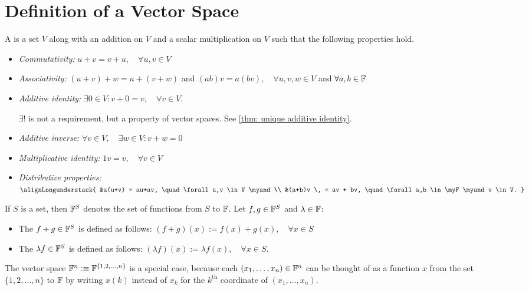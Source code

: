 \section{Definition of a Vector Space}

\setcounter{thm}{19}
\begin{mydef} 
  A  is a set $V$ along with an addition on $V$ and a scalar multiplication on $V$ such that the following properties hold.
  \begin{itemize}
    \item \emph{Commutativity:}
    $ u+v = v+u, \quad \forall u,v \in V$
    \item \emph{Associativity:}
    $(u+v)+w=u+(v+w)$ and $(ab)v=a(bv), \quad \forall u,v,w \in V$ and $\forall a,b \in \mathbb{F}$
    \item \emph{Additive identity:}
    $\exists 0\in V:v+0=v, \quad \forall v\in V$.

    $\exists!$ is not a requirement, but a property of vector spaces. See \ref{thm: unique additive identity}.
    \item \emph{Additive inverse:}
    $\forall v\in V, \quad \exists w\in V: v+w=0$
    \item \emph{Multiplicative identity:}
    $1v = v, \quad \forall v\in V$
    \item \emph{Distributive properties:}
    $
      \alignLongunderstack{
        &a(u+v) = au+av, \quad \forall u,v \in V \myand  \\
        &(a+b)v \, = av + bv, \quad \forall a,b \in \myF \myand v \in V.
      }
    $
  \end{itemize}
\end{mydef}

\setcounter{thm}{23}
\begin{mydef} 
  If $S$ is a set, then $\mathbb{F}^S$ denotes the set of functions from $S$ to $\mathbb{F}$. Let $f, g \in \mathbb{F}^{S}$ and $\lambda \in \mathbb{F}$:
  \begin{itemize}
    \item The  $f+g \in \mathbb{F}^{S}$ is defined as follows: $(f+g)(x) := f(x)+ g(x), \quad \forall x\in S$
    \item The  $\lambda f \in \mathbb{F}^{S}$ is defined as follows: $(\lambda f)(x) := \lambda f(x), \quad \forall x \in S$.
  \end{itemize}
  The vector space $\mathbb{F}^{n} :\equiv \mathbb{F}^{\{1,2,\dots,n\}}$ is a special case, because each $(x_1, \dots, x_n) \in \mathbb{F}^{n}$ can be thought of as a function $x$ from the set $\{1, 2, \dots, n\}$ to $\mathbb{F}$ by writing $x(k)$ instead of $x_k$ for the $k^{\text{th}}$ coordinate of $(x_1, \dots, x_n)$.
\end{mydef}

